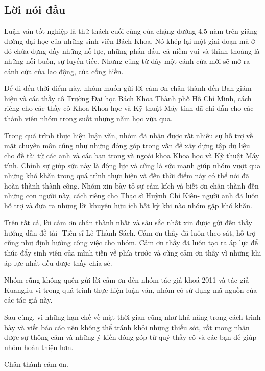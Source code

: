 \documentclass[a4paper]{article}
\theoremstyle{definition}
\begin{document}
	\newpage 
	\subsection*{Lời nói đầu}
	
	Luận văn tốt nghiệp là thử thách cuối cùng của chặng đường 4.5 năm trên giảng đường đại học của những sinh viên Bách Khoa. Nó khép lại một giai đoạn mà ở đó chứa đựng đầy những nỗ lực, những phấn đấu, cả niềm vui và thỉnh thoảng là những nỗi buồn, sự luyến tiếc. Nhưng cũng từ đây một cánh cửa mới sẽ mở ra- cánh cửa của lao động, của cống hiến. 
	
	Để đi đến thời điểm này, nhóm muốn gửi lời cảm ơn chân thành đến Ban giám hiệu và các thầy cô Trường Đại học Bách Khoa Thành phố Hồ Chí Minh, cách riêng cho các thầy cô Khoa Khoa học và Kỹ thuật Máy tính đã chỉ dẫn cho các thành viên nhóm trong suốt những năm học vừa qua.
	
	Trong quá trình thực hiện luận văn, nhóm đã nhận được rất nhiều sự hỗ trợ về mặt chuyên môn cũng như những đóng góp trong vấn đề xây dựng tập dữ liệu cho đề tài từ các anh và các bạn trong và ngoài khoa Khoa học và Kỹ thuật Máy tính. Chính sự giúp sức này là động lực và cũng là sức mạnh giúp nhóm vượt qua những khó khăn trong quá trình thực hiện và đến thời điểm này có thể nói đã hoàn thành thành công. Nhóm xin bày tỏ sự cảm kích và biết ơn chân thành đến những con người này, cách riêng cho Thạc sĩ Huỳnh Chí Kiên- người anh đã luôn hỗ trợ và đưa ra những lời khuyên hữu ích bất kỳ khi nào nhóm gặp khó khăn. 
	
	Trên tất cả, lời cảm ơn chân thành nhất và sâu sắc nhất xin được gửi đến thầy hướng dẫn đề tài- Tiến sĩ Lê Thành Sách. Cảm ơn thầy đã luôn theo sát, hỗ trợ cũng như định hướng công việc cho nhóm. Cảm ơn thầy đã luôn tạo ra áp lực để thúc đẩy sinh viên của mình tiến về phía trước và cũng cảm ơn thầy vì những khi áp lực nhất đều được thầy chia sẻ. 
	
	Nhóm cũng không quên gửi lời cảm ơn đến nhóm tác giả khoá 2011\cite{qak} và tác giả Kuangliu\cite{github} vì trong quá trình thực hiện luận văn, nhóm có sử dụng mã nguồn của các tác giả này.
	
	Sau cùng, vì những hạn chế về mặt thời gian cũng như khả năng trong cách trình bày và viết báo cáo nên không thể tránh khỏi những thiếu sót, rất mong nhận được sự thông cảm và những ý kiến đóng góp từ quý thầy cô và các bạn để giúp nhóm hoàn thiện hơn.
	
	Chân thành cảm ơn.
	
\end{document}
